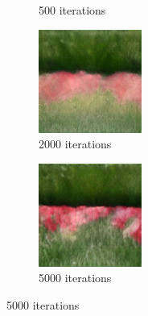 \documentclass{article}
\begin{document}
\begin{figure}[h!]
\begin{subfigure}[b]{0.24\textwidth}
         \caption{500 iterations}
     \end{subfigure}
     \begin{subfigure}[b]{0.24\textwidth}
         \centering
         \includegraphics[width=\textwidth]{illustration/flower_biggan_2000.png}
         \caption{2000 iterations}
     \end{subfigure}
     \begin{subfigure}[b]{0.24\textwidth}
         \centering
         \includegraphics[width=\textwidth]{illustration/flower_biggan_5000.png}
         \caption{5000 iterations}
     \end{subfigure}
\end{figure}
\end{document}
